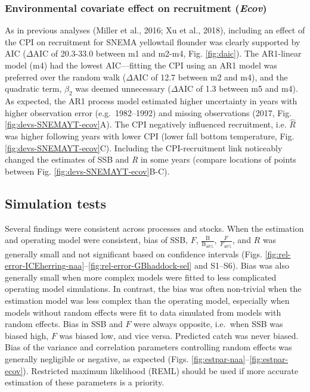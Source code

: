 \documentclass[]{article}
\begin{document}
\hypertarget{environmental-covariate-effect-on-recruitment-ecov}{%
\subsubsection{\texorpdfstring{Environmental covariate effect on
recruitment
(\emph{Ecov})}{Environmental covariate effect on recruitment (Ecov)}}\label{environmental-covariate-effect-on-recruitment-ecov}}

As in previous analyses (Miller et al., 2016; Xu et al., 2018),
including an effect of the CPI on recruitment for SNEMA yellowtail
flounder was clearly supported by AIC (\(\Delta \text{AIC}\) of
20.3-33.0 between m1 and m2-m4, Fig. \ref{fig:daic}). The AR1-linear
model (m4) had the lowest AIC---fitting the CPI using an AR1 model was
preferred over the random walk (\(\Delta \text{AIC}\) of 12.7 between m2
and m4), and the quadratic term, \(\beta_2\) was deemed unnecessary
(\(\Delta \text{AIC}\) of 1.3 between m5 and m4). As expected, the AR1
process model estimated higher uncertainty in years with higher
observation error (e.g.~1982--1992) and missing observations (2017, Fig.
\ref{fig:devs-SNEMAYT-ecov}A). The CPI negatively influenced
recruitment, i.e. \(\hat{R}\) was higher following years with lower CPI
(lower fall bottom temperature, Fig. \ref{fig:devs-SNEMAYT-ecov}C).
Including the CPI-recruitment link noticeably changed the estimates of
SSB and \emph{R} in some years (compare locations of points between Fig.
\ref{fig:devs-SNEMAYT-ecov}B-C).

\hypertarget{simulation-tests-1}{%
\subsection{Simulation tests}\label{simulation-tests-1}}

Several findings were consistent across processes and stocks. When the
estimation and operating model were consistent, bias of SSB, \(F\),
\(\frac{\text{B}}{\text{B}_{40\%}}\), \(\frac{F}{F_{40\%}}\), and \(R\)
was generally small and not significant based on confidence intervals
(Figs.
\ref{fig:rel-error-ICEherring-naa}--\ref{fig:rel-error-GBhaddock-sel}
and S1--S6). Bias was also generally small when more complex models were
fitted to less complicated operating model simulations. In contrast, the
bias was often non-trivial when the estimation model was less complex
than the operating model, especially when models without random effects
were fit to data simulated from models with random effects. Bias in SSB
and \(F\) were always opposite, i.e.~when SSB was biased high, \(F\) was
biased low, and vice versa. Predicted catch was never biased. Bias of
the variance and correlation parameters controlling random effects was
generally negligible or negative, as expected (Figs.
\ref{fig:estpar-naa}--\ref{fig:estpar-ecov}). Restricted maximum
likelihood (REML) should be used if more accurate estimation of these
parameters is a priority.
\end{document}

